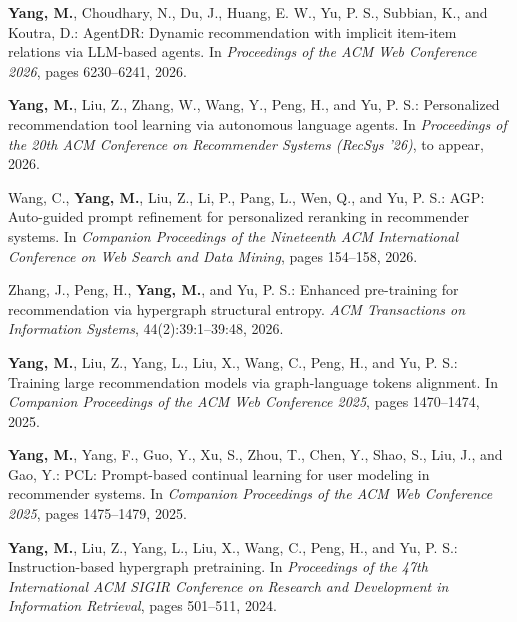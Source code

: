 \vspace{0.6em}

\begin{list}{}{%
  \setlength{\leftmargin}{0.3in}%
  \setlength{\labelwidth}{0in}%
  \setlength{\labelsep}{0in}%
  \setlength{\itemindent}{-0.3in}%
  \setlength{\itemsep}{0.45em}%
  \setlength{\topsep}{0.5em}%
  \setlength{\parsep}{0pt}%
  \let\makelabel\vitalabel}

\item[] \textbf{Yang, M.}, Choudhary, N., Du, J., Huang, E. W., Yu, P. S., Subbian, K., and Koutra, D.: AgentDR: Dynamic recommendation with implicit item-item relations via LLM-based agents. In \textit{Proceedings of the ACM Web Conference 2026}, pages 6230--6241, 2026.

\item[] \textbf{Yang, M.}, Liu, Z., Zhang, W., Wang, Y., Peng, H., and Yu, P. S.: Personalized recommendation tool learning via autonomous language agents. In \textit{Proceedings of the 20th ACM Conference on Recommender Systems (RecSys '26)}, to appear, 2026.

\item[] Wang, C., \textbf{Yang, M.}, Liu, Z., Li, P., Pang, L., Wen, Q., and Yu, P. S.: AGP: Auto-guided prompt refinement for personalized reranking in recommender systems. In \textit{Companion Proceedings of the Nineteenth ACM International Conference on Web Search and Data Mining}, pages 154--158, 2026.

\item[] Zhang, J., Peng, H., \textbf{Yang, M.}, and Yu, P. S.: Enhanced pre-training for recommendation via hypergraph structural entropy. \textit{ACM Transactions on Information Systems}, 44(2):39:1--39:48, 2026.

\item[] \textbf{Yang, M.}, Liu, Z., Yang, L., Liu, X., Wang, C., Peng, H., and Yu, P. S.: Training large recommendation models via graph-language tokens alignment. In \textit{Companion Proceedings of the ACM Web Conference 2025}, pages 1470--1474, 2025.

\item[] \textbf{Yang, M.}, Yang, F., Guo, Y., Xu, S., Zhou, T., Chen, Y., Shao, S., Liu, J., and Gao, Y.: PCL: Prompt-based continual learning for user modeling in recommender systems. In \textit{Companion Proceedings of the ACM Web Conference 2025}, pages 1475--1479, 2025.

\item[] \textbf{Yang, M.}, Liu, Z., Yang, L., Liu, X., Wang, C., Peng, H., and Yu, P. S.: Instruction-based hypergraph pretraining. In \textit{Proceedings of the 47th International ACM SIGIR Conference on Research and Development in Information Retrieval}, pages 501--511, 2024.


\end{list}
